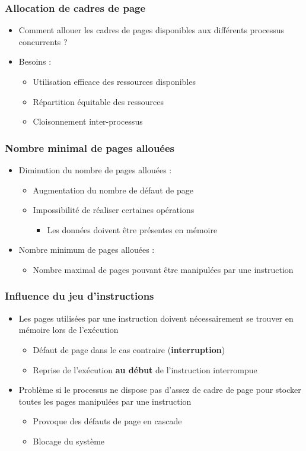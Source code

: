 \begin{frame}
\frametitle{Allocation de cadres de page}
\begin{itemize}
\item Comment allouer les cadres de pages disponibles aux différents processus concurrents ?
\item Besoins :
\begin{itemize}
\item Utilisation efficace des ressources disponibles
\item Répartition équitable des ressources
\item Cloisonnement inter-processus
\end{itemize}
\end{itemize}
\end{frame}


\begin{frame}
\frametitle{Nombre minimal de pages allouées}
\begin{itemize}
\item Diminution du nombre de pages allouées :
\begin{itemize}
\item Augmentation du nombre de défaut de page
\item Impossibilité de réaliser certaines opérations
\begin{itemize}
\item Les données doivent être présentes en mémoire
\end{itemize}
\end{itemize}
\item Nombre minimum de pages allouées :
\begin{itemize}
\item Nombre maximal de pages pouvant être manipulées par une instruction
\end{itemize}
\end{itemize}
\end{frame}


\begin{frame}
\frametitle{Influence du jeu d'instructions}
\begin{itemize}
\item Les pages utilisées par une instruction doivent nécessairement se trouver en mémoire lors de l'exécution
\begin{itemize}
\item Défaut de page dans le cas contraire (\textbf{interruption})
\item Reprise de l'exécution \textbf{au début} de l'instruction interrompue
\end{itemize}
\item Problème si le processus ne dispose pas d'assez de cadre de page pour stocker toutes les pages manipulées par une instruction
\begin{itemize}
\item Provoque des défauts de page en cascade
\item Blocage du système
\end{itemize}
\end{itemize}
\end{frame}


